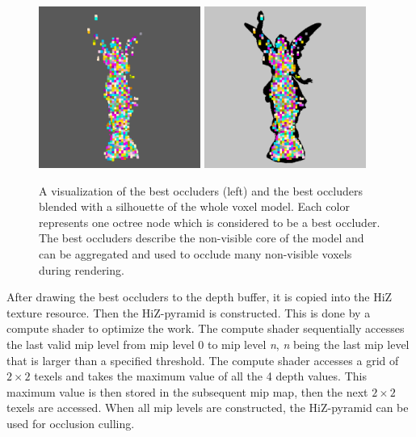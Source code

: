 \begin{figure}[h]
    \centering
    \includegraphics[width=200px]{images/graphics/lucy-best-occluders-viz.jpg}
    \includegraphics[width=200px]{images/graphics/lucy-best-occluders-diff-viz.jpg}
    \caption{A visualization of the best occluders (left) and the best occluders blended with a silhouette 
    of the whole voxel model. Each color represents one octree node which is considered to be a best occluder.
    The best occluders describe the non-visible core of the model and can be aggregated and used to occlude 
    many non-visible voxels during rendering.}
    \label{fig:best-occluder-viz}
\end{figure}

\noindent 
After drawing the best occluders to the depth buffer, it is copied into the \ac{HiZ} texture resource. 
Then the \ac{HiZ}-pyramid is constructed. This is done by a compute shader to optimize the work. The compute shader 
sequentially accesses the last valid mip level from mip level 0 to mip level \emph{n}, \emph{n} being the last 
mip level that is larger than a specified threshold. The compute shader accesses a grid of \begin{math} 2 \times 2 
\end{math} texels and takes the maximum value of all the 4 depth values. This maximum value is then stored in the 
subsequent mip map, then the next \begin{math} 2 \times 2 \end{math} texels are accessed. When all mip levels are 
constructed, the \ac{HiZ}-pyramid can be used for occlusion culling. \\

